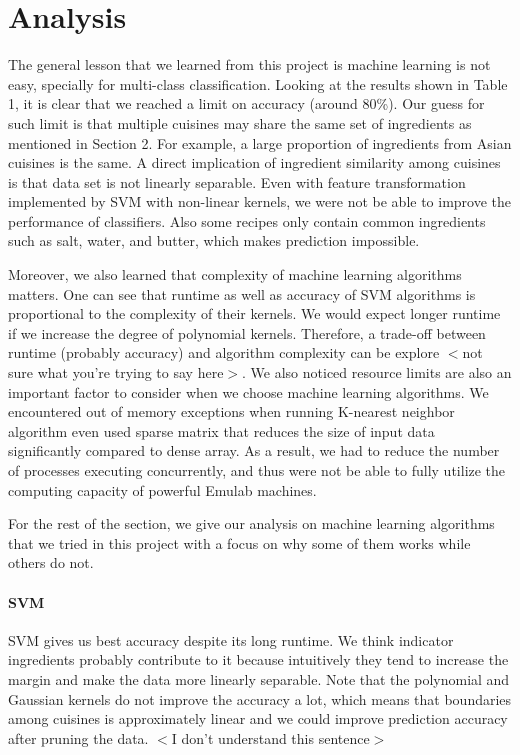 \section{Analysis}
The general lesson that we learned from this project is machine
learning is not easy, specially for multi-class
classification. Looking at the results shown in Table 1, it is clear
that we reached a limit on accuracy (around 80\%). Our guess for such
limit is that multiple cuisines may share the same set of ingredients
as mentioned in Section 2. For example, a large proportion of
ingredients from Asian cuisines is the same. A direct implication of
ingredient similarity among cuisines is that data set is not linearly
separable. Even with feature transformation implemented by SVM with
non-linear kernels, we were not be able to improve the performance of
classifiers. Also some recipes only contain common ingredients such as
salt, water, and butter, which makes prediction impossible. 

Moreover, we also learned that complexity of machine learning
algorithms matters. One can see that runtime as well as accuracy of
SVM algorithms is proportional to the complexity of their kernels. We
would expect longer runtime if we increase the degree of polynomial
kernels. Therefore, a trade-off between runtime (probably accuracy)
and algorithm complexity can be explore $<$not sure what you're trying
to say here$>$. We also noticed resource
limits are also an important factor to consider when we choose machine
learning algorithms. We encountered out of memory exceptions when
running K-nearest neighbor algorithm even used sparse matrix that
reduces the size of input data significantly compared to dense
array. As a result, we had to reduce the number of processes executing
concurrently, and thus were not be able to fully utilize the computing
capacity of powerful Emulab machines. 

For the rest of the section, we give our analysis on machine learning
algorithms that we tried in this project with a focus on why some of
them works while others do not. 

\paragraph{SVM} SVM gives us best accuracy despite its long
runtime. We think indicator ingredients probably contribute to it
because intuitively they tend to increase the margin and make the data
more linearly separable. Note that the polynomial and Gaussian kernels
do not improve the accuracy a lot, which means that boundaries among 
cuisines is approximately linear and we could improve prediction
accuracy after pruning the data.  $<$I don't understand this sentence$>$

